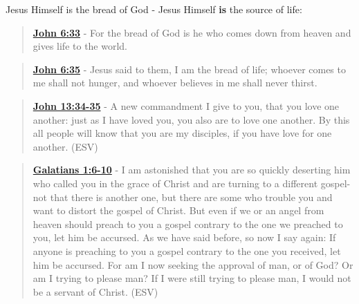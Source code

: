 \documentclass[11pt]{article}
\begin{document}
Jesus Himself is the bread of God - Jesus Himself \textbf{is} the source of life:

\begin{quote}
\textbf{\href{https://www.biblegateway.com/passage/?search=John\%206\%3A33\&version=ESV}{John 6:33}} - For the bread of God is he who comes down from heaven and gives life to the world.
\end{quote}

\begin{quote}
\textbf{\href{https://www.biblegateway.com/passage/?search=John\%206\%3A35\&version=ESV}{John 6:35}} - Jesus said to them, I am the bread of life; whoever comes to me shall not hunger, and whoever believes in me shall never thirst.
\end{quote}

\begin{quote}
\textbf{\href{https://www.biblegateway.com/passage/?search=John\%2013\%3A34-35\&version=ESV}{John 13:34-35}} - A new commandment I give to you, that you love one another: just as I have loved you, you also are to love one another. By this all people will know that you are my disciples, if you have love for one another. (ESV)
\end{quote}

\begin{quote}
\textbf{\href{https://www.biblegateway.com/passage/?search=Galatians\%201\%3A6-10\&version=ESV}{Galatians 1:6-10}} - I am astonished that you are so quickly deserting him who called you in the grace of Christ and are turning to a different gospel- not that there is another one, but there are some who trouble you and want to distort the gospel of Christ. But even if we or an angel from heaven should preach to you a gospel contrary to the one we preached to you, let him be accursed. As we have said before, so now I say again: If anyone is preaching to you a gospel contrary to the one you received, let him be accursed. For am I now seeking the approval of man, or of God? Or am I trying to please man? If I were still trying to please man, I would not be a servant of Christ. (ESV)
\end{quote}
\end{document}

